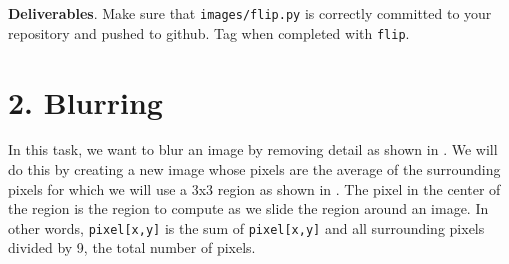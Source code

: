\begin{callout}{\bcplume}
{\bf Deliverables}. Make sure that {\tt images/flip.py} is correctly committed to your repository and pushed to github. Tag when completed with {\tt flip}.
\end{callout}

\section{2. Blurring}

In this task, we want to blur an image by removing detail as shown in . We will do this by creating a new image whose pixels are the average of the surrounding pixels for which we will use a 3x3 region as shown in . The pixel in the center of the region is the region to compute as we slide the region around an image. In other words, {\tt pixel[x,y]} is the sum of {\tt pixel[x,y]} and all surrounding pixels divided by 9, the total number of pixels.

\begin{marginfigure}
\begin{center}
\\
\end{center}
\label{blur}
\end{marginfigure}


